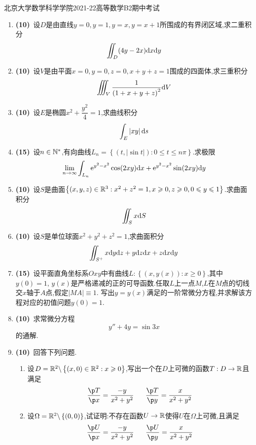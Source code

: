 \documentclass{ctexart}
\begin{document}
\pagestyle{empty}
\begin{center}\Large
    北京大学数学科学学院2021-22高等数学B2期中考试
\end{center}
\begin{enumerate}[leftmargin=*,label=\textbf{\arabic*.}]
    \item \textbf{(10)}\ 设$D$是由直线$y=0,y=1,y=x,y=x+1$所围成的有界闭区域,求二重积分
        \[\iint_D(4y-2x)\mathrm{d} x\mathrm{d} y\]
    \item \textbf{(10)}\ 设$V$是由平面$x=0,y=0,z=0,x+y+z=1$围成的四面体,求三重积分
        \[\iiint_V\dfrac{1}{\left(1+x+y+z\right)^2}\mathrm{d} V\]
    \item \textbf{(10)}\ 设$E$是椭圆$x^2+\dfrac{y^2}{4}=1$,求曲线积分
        \[\int_E\left|xy\right|\mathrm{d} s\]
    \item \textbf{(15)}\ 设$n\in\mathbb{N}^*$,有向曲线$L_n=\left\{\left(t,\left|\sin t\right|\right):0\leqslant t\leqslant n\pi\right\}$.求极限
        \[\lim_{n\to\infty}\int_{L_n}\mathrm{e}^{y^2-x^2}\cos(2xy)\mathrm{d} x+\mathrm{e}^{y^2-x^2}\sin(2xy)\mathrm{d} y\]
    \item \textbf{(10)}\ 设$S$是曲面$\left\{(x,y,z)\in\mathbb{R}^3:x^2+z^2=1,x\geqslant 0,z\geqslant 0,0\leqslant y\leqslant 1\right\}$.求曲面积分
        \[\iint_Sx\mathrm{d} S\]
    \item \textbf{(10)}\ 设$S$是单位球面$x^2+y^2+z^2=1$,求曲面积分
        \[\iint_{S^+}x\mathrm{d} y\mathrm{d} z+y\mathrm{d} z\mathrm{d} x+z\mathrm{d} x\mathrm{d} y\]
    \item \textbf{(15)}\ 设平面直角坐标系$Oxy$中有曲线$L:\left\{(x,y(x)):x\geqslant0\right\}$,其中$y(0)=1$,%
        $y(x)$是严格递减的正的可导函数.任取$L$上一点$M$,$L$在$M$点的切线交$x$轴于$A$点,假定$\left|MA\right|\equiv1$.%
        写出$y=y(x)$满足的一阶常微分方程,并求解该方程对应的初值问题$y(0)=1$.
    \item \textbf{(10)}\ 求常微分方程
        \[y''+4y=\sin3x\]
        的通解.
    \item \textbf{(10)}\ 回答下列问题.
        \begin{enumerate}[label=\tbf{(\arabic*)}]
            \item 设$D=\mathbb{R}^2\backslash\left\{(x,0)\in\mathbb{R}^2:x\geqslant 0\right\}$,写出一个在$D$上可微的函数$T:D\to\mathbb{R}$且满足
                \[\dfrac{\p T}{\p x}=\dfrac{-y}{x^2+y^2}\ \ \ \ \ \dfrac{\p T}{\p y}=\dfrac{x}{x^2+y^2}\]
            \item 设$\Omega=\mathbb{R}^2\backslash\left\{(0,0)\right\}$,试证明:不存在函数$U\to\mathbb{R}$使得$U$在$\Omega$上可微,且满足
                \[\dfrac{\p U}{\p x}=\dfrac{-y}{x^2+y^2}\ \ \ \ \ \dfrac{\p U}{\p y}=\dfrac{x}{x^2+y^2}\]
        \end{enumerate}
\end{enumerate}
\end{document}
